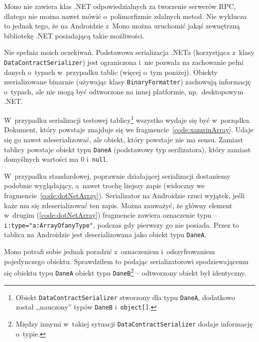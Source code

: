 \begin{description}

Mono nie zawiera klas .NET odpowiedzialnych za tworzenie serwerów RPC, dlatego nie można nawet mówić o~polimorfizmie zdalnych metod.
Nie wyklucza to jednak tego, że na Androidzie z~Mono można uruchomić jakąś zewnętrzną bibliotekę .NET posiadającą takie możliwości.

Nie spełnia moich oczekiwań.
Podstawowa serializacja .NETa (korzystjąca z~klasy \texttt{DataContractSerializer}) jest ograniczona i~nie pozwala na zachowanie pełni danych o~typach w~przypadku tablic (więcej o~tym poniżej).
Obiekty zserializowane binarnie (używając klasy \texttt{BinaryFormatter}) zachowują informację o~typach, ale nie mogą być odtworzone na innej platformie, np.\ desktopowym .NET\@. 

W~przypadku serializacji testowej tablicy\footnote{Obiekt \texttt{DataContractSerializer} stworzony dla typu \texttt{DaneA}, dodatkowo został ,,nauczony'' typów \texttt{DaneB} i~\texttt{object[]}.} wszystko wydaje się być w~porządku. Dokument, który powstaje znajduje się we fragmencie~\ref{code:xamrinArray}. Udaje się go nawet zdeserializować, ale obiekt, który powstaje nie ma sensu. Zamiast tablicy powstaje obiekt typu \texttt{DaneA} (podstawowy typ serilizatora), który zamiast domyślnych wartości ma 0 i~\texttt{null}.

W~przypadku standardowej, poprawnie działającej serializacji dostaniemy podobnie wyglądający, a~nawet trochę lżejszy zapis (widoczny we fragmencie~\ref{code:dotNetArray}).
Serializator na Androidzie rzuci wyjątek, jeśli każe mu się zdeserializować ten zapis.
Można zauważyć, że główny element w~drugim (\ref{code:dotNetArray}) fragmencie zawiera oznaczenie typu -- \texttt{i:type="a:ArrayOfanyType"}, podczas gdy pierwszy go nie posiada. Przez to tablica na Androidzie jest  deserializowana jako obiekt typu \texttt{DaneA}.

Mono potrafi sobie jednak poradzić z~oznaczeniem i~odszyfrowaniem pojedynczego obiektu. Sprawdziłem to podając serializatorowi spodziewającemu się obiektu typu \texttt{DaneA} obiekt typu \texttt{DaneB}\footnote{Między innymi w~takiej sytuacji \texttt{DataContractSerializer} dodaje informację o~typie.} -- odtworzony obiekt był identyczny.


\end{description}
